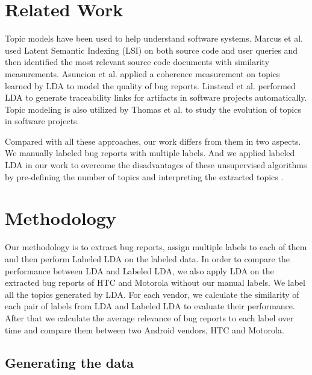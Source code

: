 \documentclass[10pt, conference, compsocconf]{IEEEtran}
\begin{document}



\section{Related Work}
Topic models have been used to help understand software systems. Marcus et al.\cite{Marcus04aninformation} used Latent Semantic Indexing (LSI) on both source code and user queries and then identified the most relevant source code documents with similarity measurements. Asuncion et al.\cite{Asuncion:2010} applied a coherence measurement on topics learned by LDA to model the quality of bug reports. Linstead et al.\cite{Linstead:2009} performed LDA to generate traceability links for artifacts in software projects automatically. Topic modeling is also utilized by Thomas et al.\cite{Thomas:2011} to study the evolution of topics in software projects.

Compared with all these approaches, our work differs from them in two aspects. We manually labeled bug reports with multiple labels. And we applied labeled LDA in our work to overcome the disadvantages of these unsupervised algorithms by pre-defining the number of topics and interpreting the extracted topics \cite{Asuncion:2010}.

\section{Methodology}

Our methodology is to extract bug reports, assign multiple labels to
each of them and then perform Labeled LDA on the labeled data. 
In
order to compare the performance between LDA and Labeled LDA, we also
apply LDA on the extracted bug reports of HTC and Motorola without our
manual labels. 
We label all the topics generated by LDA. 
For each
vendor, we calculate the similarity of each pair of labels from LDA
and Labeled LDA to evaluate their performance. 
After that we calculate
the average relevance of bug reports to each label over
time\cite{Hindle} and compare them between two Android vendors, HTC
and Motorola.

\subsection{Generating the data}
\end{document}
